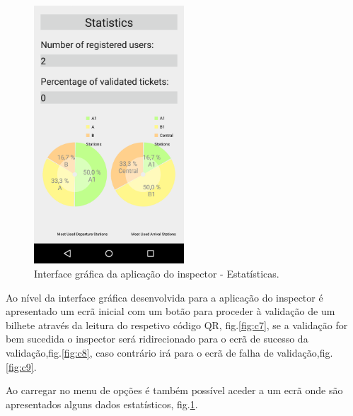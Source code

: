 \documentclass[12pt]{article}
\begin{document}
\begin{figure}[H]
	\centering
	\includegraphics[width=0.5\textwidth]{Screenshot_Inspector_Statistics.png}
	\caption{Interface gráfica da aplicação do inspector - Estatísticas.}
	\label{fig:c10}
\end{figure}

Ao nível da interface gráfica desenvolvida para a aplicação do inspector é apresentado um ecrã inicial com um botão para proceder à validação de um bilhete através da leitura do respetivo código QR, fig.\ref{fig:c7}, se a validação for bem sucedida o inspector será ridirecionado para o ecrã de sucesso da validação,fig.\ref{fig:c8}, caso contrário irá para o ecrã de falha de validação,fig.\ref{fig:c9}.

Ao carregar no menu de opções é também possível aceder a um ecrã onde são apresentados alguns dados estatísticos, fig.\ref{fig:c10}.
\end{document}
